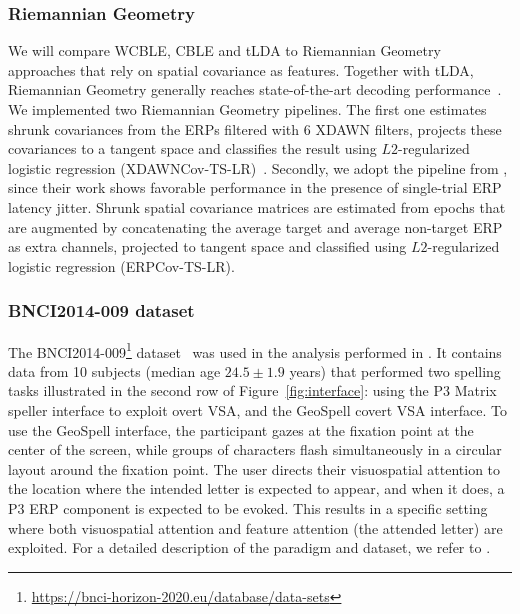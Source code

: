 \subsubsection{Riemannian Geometry}
We will compare WCBLE, CBLE and tLDA to Riemannian Geometry
approaches that rely on spatial covariance as features.
Together with tLDA, Riemannian Geometry generally reaches state-of-the-art decoding
performance~\cite{Lotte2018}.
We implemented two Riemannian Geometry pipelines.
The first one estimates shrunk covariances from the ERPs filtered with 6 XDAWN
filters, projects these covariances to a tangent space and classifies the
result using $L2$-regularized logistic regression
(XDAWNCov-TS-LR)~\cite{Cecotti2017}.
Secondly, we adopt the pipeline from \cite{Aydarkhanov2020}, since their work shows
favorable performance in the presence of single-trial ERP latency jitter.
Shrunk spatial covariance matrices are estimated from epochs that are
augmented by concatenating the average target and average non-target ERP as
extra channels, projected to tangent space and classified using
$L2$-regularized logistic regression (ERPCov-TS-LR).

\subsubsection{BNCI2014-009 dataset}
The
BNCI2014-009\footnote{\url{https://bnci-horizon-2020.eu/database/data-sets}}
dataset~\cite{Aloise2012a} was used in the analysis performed
in \cite{Arico2014}.
It contains data from 10 subjects (median age $24.5\pm1.9$
years)  that performed two spelling tasks illustrated in the second row of
Figure~\ref{fig:interface}: using the P3 Matrix speller
interface to exploit overt VSA, and the GeoSpell covert VSA interface.
To use the GeoSpell interface, the participant gazes at the fixation point at the
center of the screen, while groups of characters flash simultaneously in a
circular layout around the fixation point.
The user directs their visuospatial attention to the location where the intended letter is expected
to appear, and when it does, a P3 ERP component is expected to be evoked.
This results in a specific setting where both visuospatial attention and
feature attention (the attended letter) are exploited.
For a detailed description of the paradigm and dataset, we refer
to \cite{Aloise2012a}.

